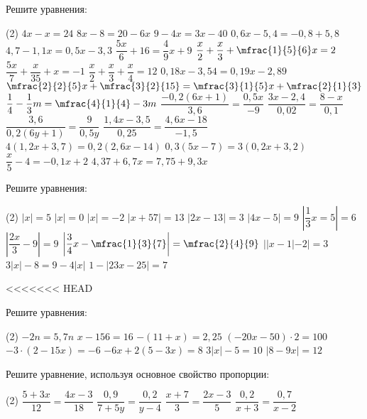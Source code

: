 \begin{class}[number=5]
	\begin{listofex}
		\item Решите уравнения: %
		\begin{tasks}(2)
			\task \( 4x-x=24 \)
			\task \( 8x-8=20-6x \)
			\task \( 9-4x=3x-40 \)
			\task \( 0,6x-5,4=-0,8+5,8 \)
			\task \( 4,7-1,1x=0,5x-3,3 \)
			\task \( \dfrac{5x}{6}+16=\dfrac{4}{9}x+9 \)
			\task \( \dfrac{x}{2}+\dfrac{x}{3}+\mfrac{1}{5}{6}x=2 \)
			\task \( \dfrac{5x}{7}+\dfrac{x}{35}+x=-1 \)
			\task \( \dfrac{x}{2}+\dfrac{x}{3}+\dfrac{x}{4}=12 \)
			\task \( 0,18x-3,54=0,19x-2,89 \)
			\task \( \mfrac{2}{2}{5}x+ \mfrac{3}{2}{15}=\mfrac{3}{1}{5}x + \mfrac{2}{1}{3} \)
			\task \( \dfrac{1}{4} - \dfrac{1}{3}m=\mfrac{4}{1}{4}-3m \)
			\task \( \dfrac{-0,2(6x+1)}{3,6}=\dfrac{0,5x}{-9} \)
			\task \( \dfrac{3x-2,4}{0,02}=\dfrac{8-x}{0,1} \)
			\task \( \dfrac{3,6}{0,2(6y+1)}=\dfrac{9}{0,5y} \)
			\task \( \dfrac{1,4x-3,5}{0,25}=\dfrac{4,6x-18}{-1,5} \)
			\task \( 4(1,2x+3,7)=0,2(2,6x-14) \)
			\task \( 0,3(5x-7)=3(0,2x+3,2) \)
			\task \( \dfrac{x}{5}-4=-0,1x+2 \)
			\task \( 4,37+6,7x=7,75+9,3x \)
		\end{tasks}
		\item Решите уравнения: %
		\begin{tasks}(2)
			\task \( |x|=5 \)
			\task \( |x|=0 \)
			\task \( |x|=-2 \)
			\task \( |x+57|=13 \)
			\task \( |2x-13|=3 \)
			\task \( |4x-5|=9 \)
			\task \( \left| \dfrac{1}{3}x=5 \right|=6 \)
			\task \( \left| \dfrac{2x}{3}-9 \right|=9 \)
			\task \( \left| \dfrac{3}{4}x-\mfrac{1}{3}{7} \right|=\mfrac{2}{4}{9} \)
			\task \( ||x-1|-2|=3 \)
			\task \( 3|x|-8=9-4|x| \)
			\task \( 1-|23x-25|=7 \)
		\end{tasks}
		
	\end{listofex}
\end{class}

<<<<<<< HEAD
\begin{homework}[number=1]
	\begin{listofex}
		\item Решите уравнения: %
		\begin{tasks}(2)
			\task \( -2n=5,7n \)
			\task \( x-156=16 \)
			\task \( -(11+x)=2,25 \)
			\task \( (-20x-50)\cdot 2 = 100 \)
			\task \( -3 \cdot (2-15x) = -6 \)
			\task \( -6x+2(5-3x)=8 \)
			\task \( 3|x|-5=10 \)
			\task \( |8-9x|=12 \)
		\end{tasks}
		\item Решите уравнение, используя основное свойство пропорции:
		\begin{tasks}(2)
			\task \( \dfrac{5+3x}{12} = \dfrac{4x-3}{18} \)
			\task \( \dfrac{0,9}{7+5y} = \dfrac{0,2}{y-4} \)
			\task \( \dfrac{x+7}{3} = \dfrac{2x-3}{5} \)
			\task \( \dfrac{0,2}{x+3} = \dfrac{0,7}{x-2} \)
		\end{tasks}
		
	\end{listofex}
\end{homework}

